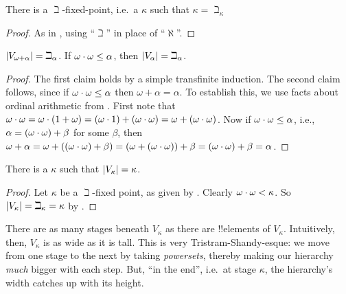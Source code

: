 \documentclass[../../../include/open-logic-section]{subfiles}
\begin{document}
\begin{prop}
There is a $\beth$-fixed-point, i.e.\ a $\kappa$ such that $\kappa =
\beth_\kappa$
\end{prop}

\begin{proof}
As in , using ``$\beth$'' in place of ``$\aleph$''. 
\end{proof}

\begin{prop}
$\left| V_{\omega+\alpha} \right| = \beth_{\alpha}$. If $\omega \cdot
\omega \leq \alpha$, then $\left| V_\alpha \right| = \beth_\alpha$.
\end{prop}

\begin{proof}
The first claim holds by a simple transfinite induction. The second
claim follows, since if $\omega \cdot \omega \leq \alpha$ then
$\omega + \alpha = \alpha$. To establish this, we use facts about
ordinal arithmetic from . First note
that $\omega \cdot \omega = \omega \cdot (1 + \omega) =
(\omega  \cdot 1) + (\omega\cdot\omega) = \omega
+ (\omega \cdot \omega)$. Now if $\omega \cdot \omega
\leq \alpha$, i.e., $\alpha = (\omega\cdot\omega) + \beta$
for some $\beta$, then $\omega + \alpha = \omega +
((\omega \cdot \omega) + \beta) = (\omega + (\omega
\cdot \omega)) + \beta = (\omega \cdot \omega) +
\beta = \alpha$. 
\end{proof}

\begin{cor}
There is a $\kappa$ such that $\left| V_\kappa \right| = \kappa$.
\end{cor}

\begin{proof}
Let $\kappa$ be a $\beth$-fixed point, as given by .
Clearly $\omega \cdot \omega < \kappa$. So $\left| V_\kappa \right| =
\beth_\kappa = \kappa$ by .
\end{proof}

There are as many stages beneath $V_\kappa$ as there are !!{element}s
of $V_\kappa$. Intuitively, then, $V_\kappa$ is as wide as it is tall.
This is very Tristram-Shandy-esque: we move from one stage to the next
by taking \emph{powersets}, thereby making our hierarchy \emph{much}
bigger with each step. But, ``in the end'', i.e.\ at stage $\kappa$,
the hierarchy's width catches up with its height. 
\end{document}
